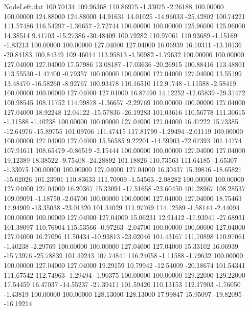 \begin{filecontents}{NodeLeft.dat}
 100.70134  109.96368  110.86975    -1.33075   -2.26188  100.00000  100.00000  124.88000  124.88000   14.91631   14.01025  -14.96033  -25.42802
 100.74221  111.57486  116.54297    -1.36657   -2.72744  100.00000  100.00000  125.96000  125.96000   14.38514    9.41703  -15.27386  -30.48409
 100.79282  110.97061  110.93689    -1.15169   -1.83213  100.00000  100.00000  127.04000  127.04000   16.06939   16.10311  -13.10136  -20.84183
 100.84349  109.46014  113.95813    -1.50982   -1.79632  100.00000  100.00000  127.04000  127.04000   17.57986   13.08187  -17.03636  -20.26915
 100.88416  113.48801  113.55530    -1.47400   -0.79357  100.00000  100.00000  127.04000  127.04000   13.55199   13.48470  -16.58260   -8.92767
 100.93478  110.16510  112.91748    -1.11588   -2.58419  100.00000  100.00000  127.04000  127.04000   16.87490   14.12252  -12.65839  -29.31472
 100.98545  108.11752  114.99878    -1.36657   -2.29769  100.00000  100.00000  127.04000  127.04000   18.92248   12.04122  -15.57836  -26.19283
 101.03616  110.56778  111.30615    -1.11588   -1.40238  100.00000  100.00000  127.04000  127.04000   16.47222   15.73385  -12.64976  -15.89755
 101.09706  111.47415  117.81799    -1.29494   -2.01119  100.00000  100.00000  127.04000  127.04000   15.56585    9.22201  -14.59903  -22.67393
 101.14774  107.91611  108.65479    -0.86519   -2.15444  100.00000  100.00000  127.04000  127.04000   19.12389   18.38522   -9.75408  -24.28892
 101.18826  110.73563  111.64185    -1.65307   -1.33075  100.00000  100.00000  127.04000  127.04000   16.30437   15.39816  -18.65821  -15.02026
 101.23901  110.83633  111.70909    -1.54563   -2.08282  100.00000  100.00000  127.04000  127.04000   16.20367   15.33091  -17.51658  -23.60450
 101.28967  108.28537  109.09091    -1.18750   -2.04700  100.00000  100.00000  127.04000  127.04000   18.75463   17.94909  -13.35038  -23.01320
 101.34029  111.97769  114.12589    -1.58144   -2.44094  100.00000  100.00000  127.04000  127.04000   15.06231   12.91412  -17.93941  -27.68931
 101.38097  110.76904  115.53566    -0.97263   -2.04700  100.00000  100.00000  127.04000  127.04000   16.27096   11.50434  -10.93813  -23.02046
 101.43167  111.70898  110.97061    -1.40238   -2.29769  100.00000  100.00000  127.04000  127.04000   15.33102   16.06939  -15.73976  -25.78839
 101.49243  107.74841  116.24058    -1.11588   -1.79632  100.00000  100.00000  127.04000  127.04000   19.29159   10.79942  -12.54009  -20.18674
 101.54341  111.67542  112.74963    -1.29494   -1.90375  100.00000  100.00000  129.22000  129.22000   17.54459   16.47037  -14.55237  -21.39411
 101.59420  110.13153  112.17903    -1.76050   -1.43819  100.00000  100.00000  128.13000  128.13000   17.99847   15.95097  -19.82095  -16.19214

\end{filecontents}
